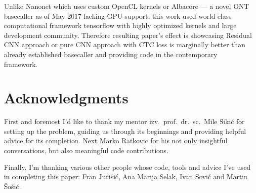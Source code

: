 \documentclass[runningheads,a4paper]{llncs}
\begin{document}
Unlike Nanonet which uses custom OpenCL kernels or Albacore --- a novel ONT basecaller as of May 2017 lacking GPU support, this work used world-class computational framework tensorflow with highly optimized kernels and large development community. Therefore resulting paper's effect is showcasing Residual CNN approach or pure CNN approach with CTC loss is marginally better than already established basecaller and providing code in the contemporary framework.

\section{Acknowledgments}

First and foremost I'd like to thank my mentor izv.~prof.~dr.~sc.~Mile Sikić for setting up the problem, guiding us through its beginnings and providing helpful advice for its completion. Next Marko Ratkovic for his not only insightful conversations, but also meaningful code contributions.

Finally, I'm thanking various other people whose code, tools and advice I've used in completing this paper: Fran Jurišić, Ana Marija Selak, Ivan Sović and Martin Šošić.


 
  
\end{document}
